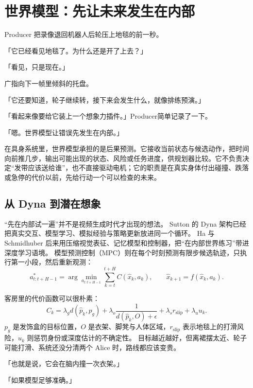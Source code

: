 \section{世界模型：先让未来发生在内部}

Producer 把录像退回机器人后轮压上地毯的前一秒。

「它已经看见地毯了。为什么还是开了上去？」

「看见，只是现在。」

广指向下一帧里倾斜的托盘。

「它还要知道，轮子继续转，接下来会发生什么，就像排练预演。」

「看起来像要给它装上一个想象力插件。」Producer简单记录了一下。

「嗯。世界模型让错误先发生在内部。」

在具身系统里，世界模型承担的是后果预测。它接收当前状态与候选动作，把时间向前推几步，输出可能出现的状态、风险或任务进度，供规划器比较。它不负责决定“发带应该送给谁”，也不直接驱动电机；它的职责是在真实身体付出碰撞、跌落或急停的代价以前，先给行动一个可以检查的未来。

\subsection{从 Dyna 到潜在想象}

“先在内部试一遍”并不是视频生成时代才出现的想法。
Sutton 的 Dyna 架构已经把真实交互、模型学习、模拟经验与策略更新放进同一个循环\cite{sutton1991dyna}。
Ha 与 Schmidhuber 后来用压缩视觉表征、记忆模型和控制器，把“在内部世界练习”带进深度学习语境\cite{ha2018worldmodels}。
模型预测控制（MPC）则在每个时刻预测有限步候选轨迹，只执行第一小段，然后重新观测：
\begin{equation}
a_{t:t+H-1}^{\ast}
=
\arg\min_{a_{t:t+H-1}}
\sum_{k=t}^{t+H}
C(\hat x_k,a_k),
\qquad
\hat x_{k+1}=f(\hat x_k,a_k).
\end{equation}

客房里的代价函数可以很朴素：
\begin{equation}
C_k=
\lambda_g d(\hat p_k,p_g)
+\lambda_o\frac{1}{d(\hat p_k,O)+\epsilon}
+\lambda_s r_{\mathrm{slip}}
+\lambda_u u_k .
\end{equation}
$p_g$ 是发饰盒的目标位置，$O$ 是衣架、脚凳与人体区域，$r_{\mathrm{slip}}$ 表示地毯上的打滑风险，$u_k$ 则惩罚身份或深度估计的不确定性。
目标越近越好，但离裙摆太近、轮子可能打滑、系统还没分清两个 Alice 时，路线都应该变贵。

「也就是说，它会在脑内撞一次衣架。」

「如果模型足够准确。」

